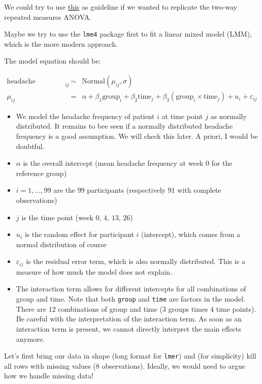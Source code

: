 \documentclass[
]{article}
\providecommand{\tightlist}{%
  \setlength{\itemsep}{0pt}\setlength{\parskip}{0pt}}
\begin{document}
We could try to use
\href{https://www.r-bloggers.com/2021/04/repeated-measures-of-anova-in-r-complete-tutorial/}{this}
as guideline if we wanted to replicate the two-way repeated measures
ANOVA.

Maybe we try to use the \texttt{lme4} package first to fit a linear
mixed model (LMM), which is the more modern approach.

The model equation should be:

\[
\begin{array}{rcl}
\text{headache frequency}_{ij} &\sim& \text{Normal}(\mu_{ij}, \sigma) \\
\mu_{ij} &=& \alpha + \beta_1 \text{group}_i + \beta_2 \text{time}_j + \beta_3 (\text{group}_i \times \text{time}_j) + u_i + \varepsilon_{ij}
\end{array}
\]

\begin{itemize}
\tightlist
\item
  We model the headache frequency of patient \(i\) at time point \(j\)
  as normally distributed. It remains to bee seen if a normally
  distributed headache frequency is a good assumption. We will check
  this later. A priori, I would be doubtful.
\item
  \(\alpha\) is the overall intercept (mean headache frequency at week
  \(0\) for the reference group)
\item
  \(i = 1, \ldots, 99\) are the \(99\) participants (respectively 91
  with complete observations)
\item
  \(j\) is the time point (week \(0\), \(4\), \(13\), \(26\))
\item
  \(u_i\) is the random effect for participant \(i\) (intercept), which
  comes from a normal distribution of course
\item
  \(\varepsilon_{ij}\) is the residual error term, which is also
  normally distributed. This is a measure of how much the model does not
  explain.
\item
  The interaction term allows for different intercepts for all
  combinations of group and time. Note that both \texttt{group} and
  \texttt{time} are factors in the model. There are \(12\) combinations
  of group and time (3 groups times 4 time points). Be careful with the
  interpretation of the interaction term. As soon as an interaction term
  is present, we cannot directly interpret the main effects anymore.
\end{itemize}

Let's first bring our data in shape (long format for \texttt{lmer}) and
(for simplicity) kill all rows with missing values (\(8\) observations).
Ideally, we would need to argue how we handle missing data!
\end{document}
